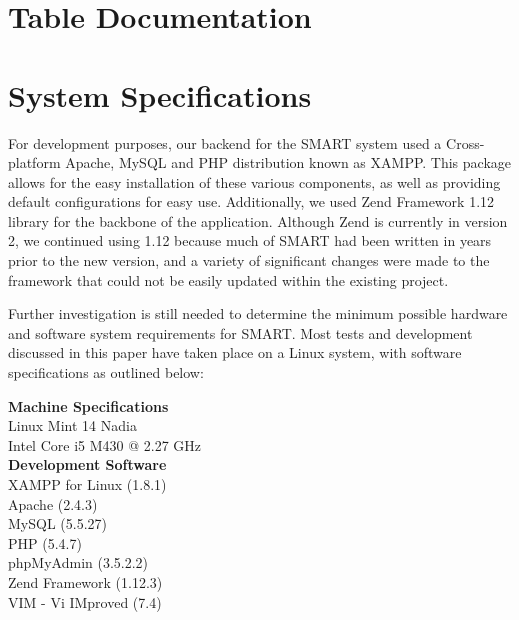 \documentclass[12pt]{article}
\begin{document}
\begin{appendices}
\clearpage
\section{Table Documentation}

\clearpage
\section{System Specifications}

For development purposes, our backend for the SMART system used a Cross-platform Apache, MySQL and PHP distribution known as XAMPP. This package allows for the easy installation of these various components, as well as providing default configurations for easy use. Additionally, we used Zend Framework 1.12 library for the backbone of the application. Although Zend is currently in version 2, we continued using 1.12 because much of SMART had been written in years prior to the new version, and a variety of significant changes were made to the framework that could not be easily updated within the existing project.

Further investigation is still needed to determine the minimum possible hardware and software system requirements for SMART. Most tests and development discussed in this paper have taken place on a Linux system, with software specifications as outlined below:
\\

\begin{spacing}{1.0}
\noindent\textbf{Machine Specifications} \\
Linux Mint 14 Nadia \\
Intel Core i5 M430 @ 2.27 GHz \\

\noindent\textbf{Development Software} \\
XAMPP for Linux (1.8.1) \\
Apache (2.4.3) \\
MySQL (5.5.27) \\
PHP (5.4.7) \\
phpMyAdmin (3.5.2.2) \\
Zend Framework (1.12.3) \\
VIM - Vi IMproved (7.4)
\end{spacing}


\end{appendices}
\end{document}
